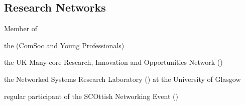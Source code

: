 \subsection{Research Networks}
\begin{cvitemize}
	\item Member of
	\begin{inlineItemize}
		\item the  (ComSoc and Young Professionals)
		\item the UK Many-core Research, Innovation and Opportunities Network ()
		\item the Networked Systems Research Laboratory () at the University of Glasgow
		\item regular participant of the SCOttish Networking Event ()
	\end{inlineItemize}
\end{cvitemize}